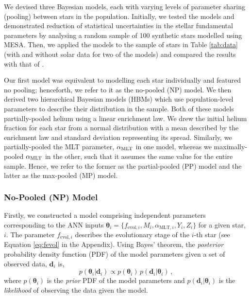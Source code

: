 

We devised three Bayesian models, each with varying levels of parameter sharing (pooling) between stars in the population. Initially, we tested the models and demonstrated reduction of statistical uncertainties in the stellar fundamental parameters by analysing a random sample of 100 synthetic stars modelled using \textsc{MESA}. Then, we applied the models to the sample of stars in Table \ref{tab:data} (with and without solar data for two of the models) and compared the results with that of .

Our first model was equivalent to modelling each star individually and featured no pooling; henceforth, we refer to it as the no-pooled (NP) model. We then derived two hierarchical Bayesian models (HBMs) which use population-level parameters to describe their distribution in the sample. Both of these models partially-pooled helium using a linear enrichment law. We drew the initial helium fraction for each star from a normal distribution with a mean described by the enrichment law and standard deviation representing its spread. Similarly, we partially-pooled the MLT parameter, ${\alpha_\mathrm{MLT}}$ in one model, whereas we maximally-pooled ${\alpha_\mathrm{MLT}}$ in the other, such that it assumes the same value for the entire sample. Hence, we refer to the former as the partial-pooled (PP) model and the latter as the max-pooled (MP) model.

\subsubsection{No-Pooled (NP) Model}\label{sec:np}

Firstly, we constructed a model comprising independent parameters corresponding to the ANN inputs $\boldsymbol{\theta}_i = \{f_{\mathrm{evol}, i}, M_i, \alpha_{\mathrm{MLT},i}, Y_i, Z_i\}$ for a given star, $i$. The parameter $f_{\mathrm{evol}, i}$ describes the evolutionary stage of the $i$-th star (see Equation \ref{eq:fevol} in the Appendix). Using Bayes' theorem, the \emph{posterior} probability density function (PDF) of the model parameters given a set of observed data, $\boldsymbol{d}_i$ is,
%
\begin{equation}
    p(\boldsymbol{\theta}_i | \boldsymbol{d}_i) \propto p(\boldsymbol{\theta}_i) \, p(\boldsymbol{d}_i | \boldsymbol{\theta}_i)\,,
    \label{eq:bayes}
\end{equation}
%
where $p(\boldsymbol{\theta}_i)$ is the \emph{prior} PDF of the model parameters and $p(\boldsymbol{d}_i | \boldsymbol{\theta}_i)$ is the \emph{likelihood} of observing the data given the model.

